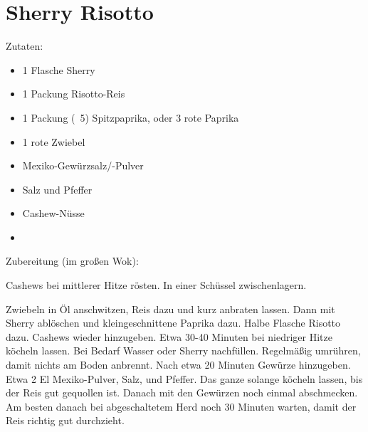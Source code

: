 \section{Sherry Risotto}
Zutaten:
\begin{itemize}
    \item 1 Flasche Sherry
    \item 1 Packung Risotto-Reis
    \item 1 Packung (~5) Spitzpaprika, oder 3 rote Paprika
    \item 1 rote Zwiebel
    \item Mexiko-Gewürzsalz/-Pulver
    \item Salz und Pfeffer
    \item Cashew-Nüsse
    \item 
\end{itemize}

\noindent Zubereitung (im großen Wok):

\noindent Cashews bei mittlerer Hitze rösten. In einer Schüssel zwischenlagern.

Zwiebeln in Öl anschwitzen, Reis dazu und kurz anbraten lassen. Dann mit Sherry
ablöschen und kleingeschnittene Paprika dazu. Halbe Flasche Risotto dazu.
Cashews wieder hinzugeben. Etwa 30-40 Minuten bei niedriger Hitze köcheln
lassen. Bei Bedarf Wasser oder Sherry nachfüllen. Regelmäßig umrühren, damit
nichts am Boden anbrennt. Nach etwa 20 Minuten Gewürze hinzugeben. Etwa 2 El
Mexiko-Pulver, Salz, und Pfeffer. Das ganze solange köcheln lassen, bis der
Reis gut gequollen ist. Danach mit den Gewürzen noch einmal abschmecken. Am
besten danach bei abgeschaltetem Herd noch 30 Minuten warten, damit der Reis
richtig gut durchzieht.

\newpage
\mbox{}
\vfill
\begin{center}
\end{center}
\vfill
\mbox{ }
\newpage
